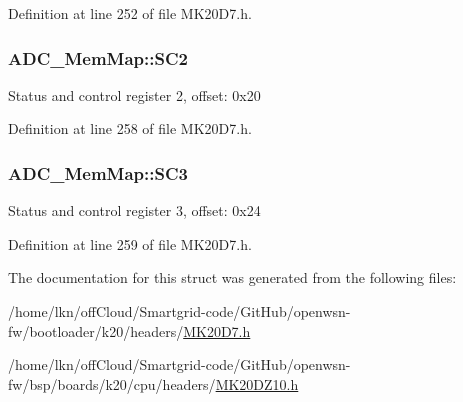 Definition at line 252 of file M\+K20\+D7.\+h.

\subsubsection[{\texorpdfstring{S\+C2}{SC2}}]{ A\+D\+C\+\_\+\+Mem\+Map\+::\+S\+C2}\hypertarget{struct_a_d_c___mem_map_ad7caff2bf5e2dfb2159d174af24dc693}{}\label{struct_a_d_c___mem_map_ad7caff2bf5e2dfb2159d174af24dc693}
Status and control register 2, offset\+: 0x20 

Definition at line 258 of file M\+K20\+D7.\+h.

\subsubsection[{\texorpdfstring{S\+C3}{SC3}}]{ A\+D\+C\+\_\+\+Mem\+Map\+::\+S\+C3}\hypertarget{struct_a_d_c___mem_map_a68295218c104f78bc2b11f04c06ce55e}{}\label{struct_a_d_c___mem_map_a68295218c104f78bc2b11f04c06ce55e}
Status and control register 3, offset\+: 0x24 

Definition at line 259 of file M\+K20\+D7.\+h.



The documentation for this struct was generated from the following files\+:\begin{DoxyCompactItemize}
\item 
/home/lkn/off\+Cloud/\+Smartgrid-\/code/\+Git\+Hub/openwsn-\/fw/bootloader/k20/headers/\hyperlink{bootloader_2k20_2headers_2_m_k20_d7_8h}{M\+K20\+D7.\+h}\item 
/home/lkn/off\+Cloud/\+Smartgrid-\/code/\+Git\+Hub/openwsn-\/fw/bsp/boards/k20/cpu/headers/\hyperlink{_m_k20_d_z10_8h}{M\+K20\+D\+Z10.\+h}\end{DoxyCompactItemize}
